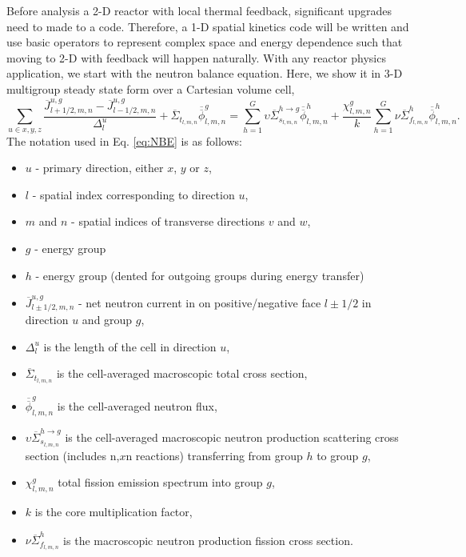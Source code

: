 \documentclass{ansconf}
\numberwithin{equation}{section}
\begin{document}
Before analysis a 2-D reactor with local thermal feedback, significant upgrades need to made to a code. Therefore, a 1-D spatial kinetics code will be written and use basic operators to represent complex space and energy dependence such that moving to 2-D with feedback will happen naturally. With any reactor physics application, we start with the neutron balance equation. Here, we show it in 3-D multigroup steady state form over a Cartesian volume cell,
\begin{equation}
\label{eq:NBE}
\sum_{u \in x,y,z} \frac{\overline{J}^{u,g}_{l+1/2,m,n} - \overline{J}^{u,g}_{l-1/2,m,n}}{\Delta_l^u} + \overline\Sigma_{t_{l,m,n}}\overline{\overline{\phi}}_{l,m,n}^g = \sum_{h=1}^G\upsilon\overline\Sigma^{h\rightarrow g}_{s_{l,m,n}}\overline{\overline{\phi}}_{l,m,n}^h + \frac{\chi_{l,m,n}^g}{k}\sum_{h=1}^G\nu\overline\Sigma^{h}_{f_{l,m,n}} \overline{\overline{\phi}}_{l,m,n}^h.
\end{equation}
The notation used in Eq. \eqref{eq:NBE} is as follows:
\begin{itemize}
	\item $u$ - primary direction, either $x$, $y$ or $z$,
	\item $l$ - spatial index corresponding to direction $u$,
	\item $m$ and $n$ - spatial indices of transverse directions $v$ and $w$,
	\item $g$ - energy group
	\item $h$ - energy group (dented for outgoing groups during energy transfer)
	\item $\overline{J}^{u,g}_{l\pm1/2,m,n}$ - net neutron current in on positive/negative face $l\pm1/2$ in direction $u$ and group $g$,
	\item $\Delta^u_l$ is the length of the cell in direction $u$,
	\item $\overline\Sigma_{t_{l,m,n}}$ is the cell-averaged macroscopic total cross section,
	\item $\overline{\overline{\phi}}_{l,m,n}^g$ is the cell-averaged neutron flux,
	\item $\upsilon\overline\Sigma^{h\rightarrow g}_{s_{l,m,n}}$ is the cell-averaged macroscopic neutron production scattering cross section (includes n,$x$n reactions) transferring from group $h$ to group $g$,
	\item $\chi_{l,m,n}^g$ total fission emission spectrum into group $g$,
	\item $k$ is the core multiplication factor,
	\item $\nu\overline\Sigma^{h}_{f_{l,m,n}}$ is the macroscopic neutron production fission cross section.
\end{itemize}
\end{document}
